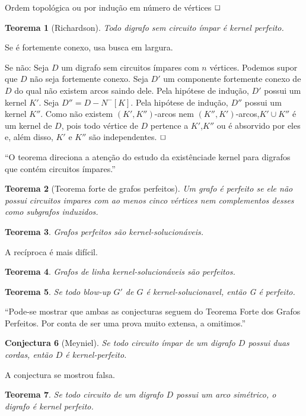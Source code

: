 \documentclass[]{article}
\newtheorem{theorem}{Teorema}
\newtheorem{conjecture}[theorem]{Conjectura}
\newenvironment{proof}{\noindent{\bf Prova:}}{$\hfill \Box$ \vspace{10pt}}
\begin{document}
\begin{proof}
Ordem topológica ou por indução em número de vértices
\end{proof}


\begin{theorem}[Richardson]
Todo digrafo sem circuito ímpar é kernel perfeito.
\end{theorem}
\begin{proof}
Se é fortemente conexo, usa busca em largura.

Se não:
Seja $D$ um digrafo sem circuitos ímpares com $n$ vértices. 
Podemos supor que $D$ não seja fortemente conexo. 
Seja $D'$ um componente fortemente conexo de $D$ do 
qual não existem arcos saindo dele. 
Pela hipótese de indução,
$D'$ possui um kernel $K'$. 
Seja $D''= D-N^-[K]$. Pela hipótese de indução, $D''$ possui um kernel $K''$.
Como não existem $(K',K'')$-arcos nem $(K'',K')$-arcos,$K' \cup K''$ é um kernel de
$D$, pois todo vértice de $D$ pertence a $K'$,$K''$ ou é absorvido por eles e, além disso, $K'$ e $K''$ são independentes.
\end{proof}

“O teorema direciona a atenção do estudo da existênciade kernel para digrafos que contém circuitos ímpares.”


\begin{theorem}[Teorema forte de grafos perfeitos]
Um grafo é perfeito se ele não possui circuitos impares com ao menos cinco vértices nem complementos desses como subgrafos induzidos.
\end{theorem}

\begin{theorem}
Grafos perfeitos são kernel-solucionáveis.
\end{theorem}

A recíproca é mais difícil.

\begin{theorem}
Grafos de linha kernel-solucionáveis são perfeitos.
\end{theorem}

\begin{theorem}
Se todo blow-up $G'$ de $G$ é kernel-solucionavel, então G é perfeito.
\end{theorem}

“Pode-se mostrar que ambas as conjecturas seguem do Teorema Forte dos Grafos Perfeitos. Por conta de ser uma prova muito extensa, a omitimos.”

\begin{conjecture}[Meyniel]
Se todo circuito ímpar de um digrafo $D$ possui duas cordas, então $D$ é kernel-perfeito.
\end{conjecture}

A conjectura se mostrou falsa.


\begin{theorem}
Se todo circuito de um digrafo $D$ possui um arco simétrico, o digrafo é kernel perfeito.
\end{theorem}
\end{document}
